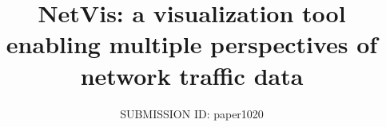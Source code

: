 
\title[NetVis Network Traffic Visualization]
      {NetVis: a visualization tool enabling multiple perspectives of network traffic data}

\author[SUBMISSION ID: paper1020]
       {SUBMISSION ID: paper1020
       }

